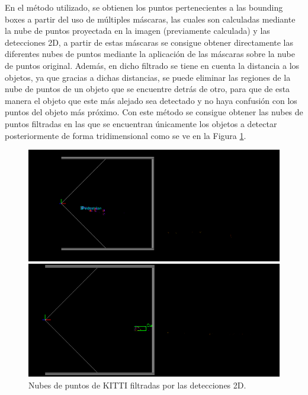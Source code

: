 En el método utilizado, se obtienen los puntos pertenecientes a las bounding boxes a partir del uso de múltiples máscaras, las cuales son calculadas mediante la nube de puntos proyectada en la imagen (previamente calculada) y las detecciones 2D, a partir de estas máscaras se consigue obtener directamente las diferentes nubes de puntos mediante la aplicación de las máscaras sobre la nube de puntos original. Además, en dicho filtrado se tiene en cuenta la distancia a los objetos, ya que gracias a dichas distancias, se puede eliminar las regiones de la nube de puntos de un objeto que se encuentre detrás de otro, para que de esta manera el objeto que este más alejado sea detectado y no haya confusión con los puntos del objeto más próximo. Con este método se consigue obtener las nubes de puntos filtradas en las que se encuentran únicamente los objetos a detectar posteriormente de forma tridimensional como se ve en la Figura \ref{fig:Nubes de puntos de KITTI filtradas por las detecciones 2D.}.

\begin{figure}[H]
	\begin{minipage}{0.495\textwidth}
		\centering
		\includegraphics[width=1\linewidth]{Book/figures/7_roi/kitti_pcl_filt_0.png}
	\end{minipage}\hfill
	\begin{minipage}{0.495\textwidth}
		\centering
		\includegraphics[width=1\linewidth]{Book/figures/7_roi/kitti_pcl_filt_2.png}
	\end{minipage}
	\caption{Nubes de puntos de KITTI filtradas por las detecciones 2D.}
	\label{fig:Nubes de puntos de KITTI filtradas por las detecciones 2D.}
\end{figure}

